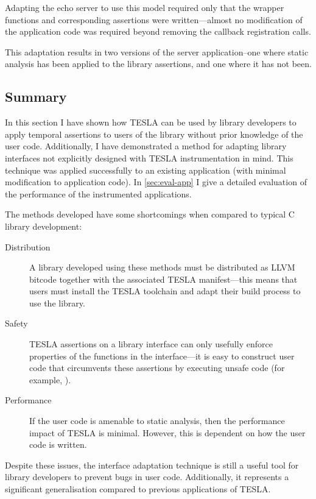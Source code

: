 Adapting the echo server to use this model required only that the
wrapper functions and corresponding assertions were written---almost no
modification of the application code was required beyond removing the callback
registration calls.

This adaptation results in two versions of the server application--one where
static analysis has been applied to the library assertions, and one where it has
not been.

\subsection{Summary}

In this section I have shown how TESLA can be used by library developers to
apply temporal assertions to users of the library without prior knowledge of the
user code. Additionally, I have demonstrated a method for adapting library
interfaces not explicitly designed with TESLA instrumentation in mind. This
technique was applied successfully to an existing application (with minimal
modification to application code). In \autoref{sec:eval-app} I give a detailed
evaluation of the performance of the instrumented applications.

The methods developed have some shortcomings when compared to typical C library
development:
\begin{description}
  \item[Distribution] A library developed using these methods must be
    distributed as LLVM bitcode together with the associated TESLA
    manifest---this means that users must install the TESLA toolchain and adapt
    their build process to use the library.

  \item[Safety] TESLA assertions on a library interface can only usefully
    enforce properties of the functions in the interface---it is easy to construct
    user code that circumvents these assertions by executing unsafe code (for
    example, ).

  \item[Performance] If the user code is amenable to static analysis, then the
    performance impact of TESLA is minimal. However, this is dependent on how
    the user code is written.
\end{description}

Despite these issues, the interface adaptation technique is still a useful tool
for library developers to prevent bugs in user code. Additionally, it represents
a significant generalisation compared to previous applications of TESLA.
